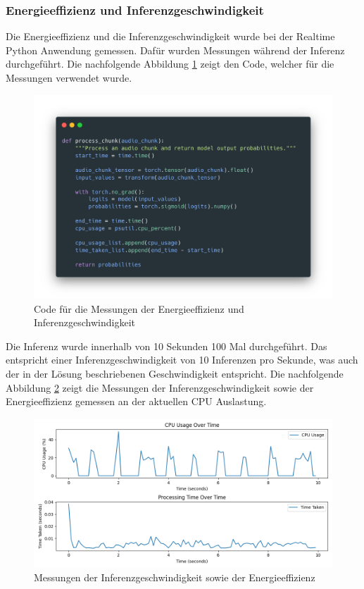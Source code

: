 \documentclass[11pt,a4paper]{article}
\begin{document}
\subsubsection{Energieeffizienz und Inferenzgeschwindigkeit}
Die Energieeffizienz und die Inferenzgeschwindigkeit wurde bei der Realtime Python Anwendung 
gemessen. Dafür wurden Messungen während der Inferenz durchgeführt. Die nachfolgende Abbildung 
\ref{fig:profiling_code} zeigt den Code, welcher für die Messungen verwendet wurde. 

\noindent
\begin{figure}[H]
	\centering
	\includegraphics[width=1.0\linewidth, trim=0 20pt 0 40pt, clip]{img/profiling_code.png}
	\caption{Code für die Messungen der Energieeffizienz und Inferenzgeschwindigkeit}
	\label{fig:profiling_code}
\end{figure}

\noindent \newline
Die Inferenz wurde innerhalb von 10 Sekunden 100 Mal durchgeführt. Das entspricht einer 
Inferenzgeschwindigkeit von 10 Inferenzen pro Sekunde, was auch der in der Lösung beschriebenen 
Geschwindigkeit entspricht. Die nachfolgende Abbildung \ref{fig:profiling} zeigt die Messungen der 
Inferenzgeschwindigkeit sowie der Energieeffizienz gemessen an der aktuellen CPU Auslastung.

\begin{figure}[H]
	\centering
	\includegraphics[width=1.0\linewidth]{img/profiling_plot.png}
	\caption{Messungen der Inferenzgeschwindigkeit sowie der Energieeffizienz}
	\label{fig:profiling}
\end{figure}
\end{document}
